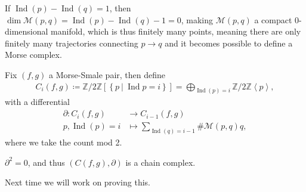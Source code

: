 \begin{remark}

If \(\mathop{\mathrm{Ind}}(p) - \mathop{\mathrm{Ind}}(q) = 1\), then
\(\dim \mathcal{M}(p, q) = \mathop{\mathrm{Ind}}(p) - \mathop{\mathrm{Ind}}(q) - 1 = 0\),
making \(\mathcal{M}(p, q)\) a compact 0-dimensional manifold, which is
thus finitely many points, meaning there are only finitely many
trajectories connecting \(p\to q\) and it becomes possible to define a
Morse complex.

\end{remark}

\begin{definition}

Fix \((f, g)\) a Morse-Smale pair, then define
\begin{align*}
C_i(f, g) \coloneqq{\mathbb{Z}}/2{\mathbb{Z}}\left[\left\{{p {~\mathrel{\Big|}~}\mathop{\mathrm{Ind}}p = i}\right\}\right] = \bigoplus_{\mathop{\mathrm{Ind}}(p) = i} {\mathbb{Z}}/2{\mathbb{Z}}\left\langle{p}\right\rangle
,\end{align*}
with a differential
\begin{align*}
{{\partial}}: C_i(f, g) &\to C_{i-1}(f, g) \\
p, \mathop{\mathrm{Ind}}(p) = i & \mapsto \sum_{\mathop{\mathrm{Ind}}(q) = i-1} \# \mathcal{M}(p, q) q 
,\end{align*}
where we take the count mod 2.

\end{definition}

\begin{theorem}[?]

\({{\partial}}^2 = 0\), and thus \(( C(f, g), {{\partial}})\) is a chain
complex.

\end{theorem}

Next time we will work on proving this.

\cleardoublepage

\renewcommand{\listtheoremname}{}
\listoftheorems[ignoreall,show={definition}, numwidth=3.5em]
\cleardoublepage

\renewcommand{\listtheoremname}{}
\listoftheorems[ignoreall,show={theorem,proposition}, numwidth=3.5em]
\cleardoublepage

\renewcommand{\listtheoremname}{}
\listoftheorems[ignoreall,show={exercise}, numwidth=3.5em]
\cleardoublepage

\listoffigures
\cleardoublepage


\printbibliography[title=Bibliography]



